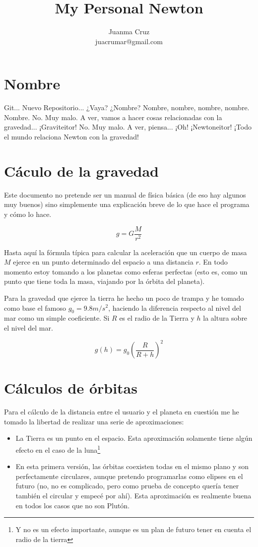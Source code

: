 \documentclass[11pt,a4paper]{article}
\title{My Personal Newton}
\author{Juanma Cruz \\ juacrumar@gmail.com}
\begin{document}
\maketitle

\section{Nombre}
Git... Nuevo Repositorio... ¿Vaya? ¿Nombre? Nombre, nombre, nombre, nombre. Nombre. No. Muy malo. A ver, vamos a hacer cosas relacionadas con la gravedad... ¡Graviteitor! No. Muy malo. A ver, piensa... ¡Oh! ¡Newtoneitor! ¡Todo el mundo relaciona Newton con la gravedad!

\section{Cáculo de la gravedad}
Este documento no pretende ser un manual de física básica (de eso hay algunos muy buenos) sino simplemente una explicación breve de lo que hace el programa y cómo lo hace.

\begin{equation}
g = G\frac{M}{r^2}
\end{equation}

Hasta aquí la fórmula típica para calcular la aceleración que un cuerpo de masa $M$ ejerce en un punto determinado del espacio a una distancia $r$. En todo momento estoy tomando a los planetas como esferas perfectas (esto es, como un punto que tiene toda la masa, viajando por la órbita del planeta).

Para la gravedad que ejerce la tierra he hecho un poco de trampa y he tomado como base el famoso $g_0 = 9.8 m/s^2$, haciendo la diferencia respecto al nivel del mar como un simple coeficiente. Si $R$ es el radio de la Tierra y $h$ la altura sobre el nivel del mar.

\begin{equation}
    g(h) = g_0\left(\frac{R}{R+h}\right)^2
\end{equation}

\section{Cálculos de órbitas}
Para el cálculo de la distancia entre el usuario y el planeta en cuestión me he tomado la libertad de realizar una serie de aproximaciones:

\begin{itemize}
    \item La Tierra es un punto en el espacio. Esta aproximación solamente tiene algún efecto en el caso de la luna\footnote{Y no es un efecto importante, aunque es un plan de futuro tener en cuenta el radio de la tierra}
    \item En esta primera versión, las órbitas coexisten todas en el mismo plano y son perfectamente circulares, aunque pretendo programarlas como elipses en el futuro (no, no es complicado, pero como prueba de concepto quería tener también el circular y empecé por ahí). Esta aproximación es realmente buena en todos los casos que no son Plutón.
\end{itemize}
\end{document}
